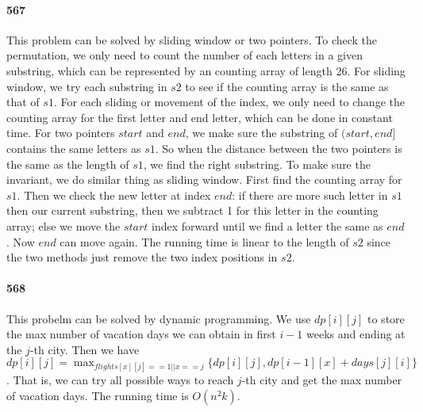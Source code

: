 \documentclass[11pt]{article}
\begin{document}
\paragraph{567}
This problem can be solved by sliding window or two pointers.
To check the permutation, we only need to count the number of each letters in a given substring, which can be represented by an 
counting array of length 26.
For sliding window, we try each substring in $s2$ to see if the counting array is the same as that of $s1$.
For each sliding or movement of the index, we only need to change the counting array for the first letter and end letter, which
can be done in constant time.
For two pointers $start$ and $end$, we make sure the substring of $(start, end]$ contains the same letters as $s1$. So when the 
distance between the two pointers is the same as the length of $s1$, we find the right substring. To make sure the invariant, 
we do similar thing as sliding window. First find the counting array for $s1$. Then we check the new letter at index $end$: if
there are more such letter in $s1$ then our current substring, then we subtract 1 for this letter in the counting array; else
we move the $start$ index forward until we find a letter the same as $end$.
Now $end$ can move again.
The running time is linear to the length of $s2$ since the two methods just remove the two index positions in $s2$.

\paragraph{568}
This probelm can be solved by dynamic programming.
We use $dp[i][j]$ to store the max number of vacation days we can obtain in first $i-1$ weeks and ending at the $j$-th city.
Then we have $dp[i][j] = \max_{flights[x][j] == 1 || x == j} \{ dp[i][j], dp[i-1][x] + days[j][i] \}$. 
That is, we can try all possible ways to reach $j$-th city and get the max number of vacation days.
The running time is $O(n^2 k)$.
\end{document}
